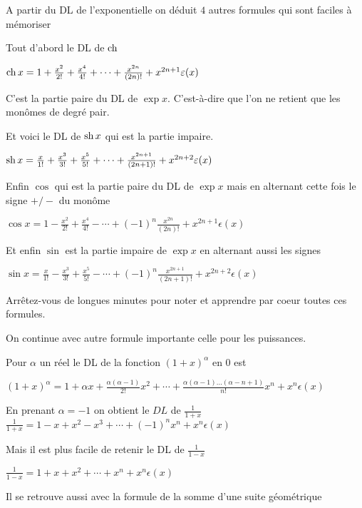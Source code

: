 A partir du DL de l'exponentielle on déduit $4$ autres formules qui sont faciles à mémoriser

Tout d'abord le DL de $\mathop{\mathrm{ch}}\nolimits$

$\mathop{\mathrm{ch}}\nolimits x=1+\frac{x^2}{2!}+\frac{x^4}{4!}+\cdots+\frac{x^{2n}}{(2n)!}
+x^{2n+1}\varepsilon(x)$ 

C'est la partie paire du DL de $\exp x$. 
C'est-à-dire que l'on ne retient que les
monômes de degré pair. 

\change

Et voici le DL de $\mathop{\mathrm{sh}}\nolimits x$ qui est la partie impaire.

$\mathop{\mathrm{sh}}\nolimits x=\frac{x}{1!}+\frac{x^3}{3!}+\frac{x^5}{5!}+\cdots
+\frac{x^{2n+1}}{(2n+1)!} 
+x^{2n+2}\varepsilon(x)$

\change

Enfin $\cos$ qui est la partie paire du DL de $\exp x$ mais en alternant cette fois le signe $+/-$ du monôme

$\cos x=1-\frac{x^2}{2!}+\frac{x^4}{4!}-\cdots+(-1)^n\frac{x^{2n}}{(2n)!}
+x^{2n+1}\epsilon(x)$ 

\change

Et enfin $\sin$ est la partie impaire de $\exp x$ en alternant aussi les signes

$\sin x=\frac{x}{1!}-\frac{x^3}{3!}+\frac{x^5}{5!}-\cdots
+(-1)^n\frac{x^{2n+1}}{(2n+1)!} 
+x^{2n+2}\epsilon(x)$



Arrêtez-vous de longues minutes pour noter et apprendre par coeur toutes ces formules.


\diapo


On continue avec autre formule importante celle pour les puissances.

Pour $\alpha$ un réel le DL de la fonction $(1+x)^{\alpha}$ en $0$ est

$(1+x)^{\alpha}=1+\alpha x+\frac{\alpha(\alpha-1)}{2!}x^2+\cdots
+\frac{\alpha(\alpha-1)...(\alpha-n+1)}{n!}x^n+x^n\epsilon(x)$

\change

En prenant $\alpha=-1$ on obtient le $DL$ de $\frac{1}{1+x}$
${\displaystyle \frac{1}{1+x}}=1-x+x^2-x^3+\cdots+(-1)^nx^n+x^n\epsilon(x)$

\change

Mais il est plus facile de retenir le DL de $\frac{1}{1-x}$

${\displaystyle \frac{1}{1-x}} = 1+x+x^2+\cdots+x^n+x^n\epsilon(x)$


Il se retrouve aussi avec la formule de la somme d'une suite géométrique

